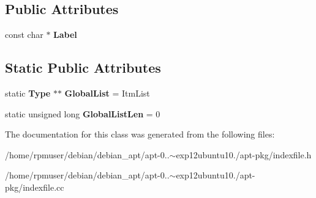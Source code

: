 \subsection*{\-Public \-Attributes}
\begin{DoxyCompactItemize}
\item 
const char $\ast$ {\bfseries \-Label}\label{classpkgIndexFile_1_1Type_a2c28600dbc88e9535c6e44b111829cc2}

\end{DoxyCompactItemize}
\subsection*{\-Static \-Public \-Attributes}
\begin{DoxyCompactItemize}
\item 
static {\bf \-Type} $\ast$$\ast$ {\bfseries \-Global\-List} = \-Itm\-List\label{classpkgIndexFile_1_1Type_a879977043c4f20338ce9dadd63026f63}

\item 
static unsigned long {\bfseries \-Global\-List\-Len} = 0\label{classpkgIndexFile_1_1Type_acdd1750df964c2a94afe622abfe15d7b}

\end{DoxyCompactItemize}


\-The documentation for this class was generated from the following files\-:\begin{DoxyCompactItemize}
\item 
/home/rpmuser/debian/debian\-\_\-apt/apt-\/0..$\sim$exp12ubuntu10./apt-\/pkg/indexfile.\-h\item 
/home/rpmuser/debian/debian\-\_\-apt/apt-\/0..$\sim$exp12ubuntu10./apt-\/pkg/indexfile.\-cc\end{DoxyCompactItemize}
